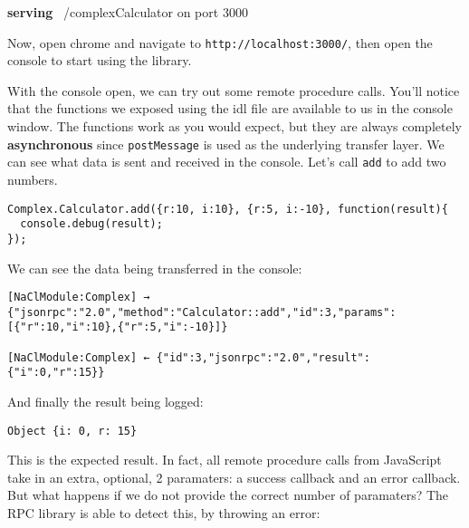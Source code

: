 \documentclass[]{article}
\newenvironment{Shaded}{}{}
\newcommand{\KeywordTok}[1]{\textcolor[rgb]{0.00,0.44,0.13}{\textbf{{#1}}}}
\newcommand{\NormalTok}[1]{{#1}}
\begin{document}
\begin{Shaded}
\begin{Highlighting}[]
\KeywordTok{serving} \NormalTok{~/complexCalculator on port 3000}
\end{Highlighting}
\end{Shaded}

Now, open chrome and navigate to \texttt{http://localhost:3000/}, then
open the console to start using the library.


 With the console open, we can try out some remote procedure calls.
You'll notice that the functions we exposed using the idl file are
available to us in the console window. The functions work as you would
expect, but they are always completely \textbf{asynchronous} since
\texttt{postMessage} is used as the underlying transfer layer. We can
see what data is sent and received in the console. Let's call
\texttt{add} to add two numbers.

\begin{verbatim}
Complex.Calculator.add({r:10, i:10}, {r:5, i:-10}, function(result){
  console.debug(result);
});
\end{verbatim}

We can see the data being transferred in the console:

\begin{verbatim}
[NaClModule:Complex] → {"jsonrpc":"2.0","method":"Calculator::add","id":3,"params":[{"r":10,"i":10},{"r":5,"i":-10}]}

[NaClModule:Complex] ← {"id":3,"jsonrpc":"2.0","result":{"i":0,"r":15}}
\end{verbatim}

And finally the result being logged:

\begin{verbatim}
Object {i: 0, r: 15}
\end{verbatim}

This is the expected result. In fact, all remote procedure calls from
JavaScript take in an extra, optional, 2 paramaters: a success callback
and an error callback. But what happens if we do not provide the correct
number of paramaters? The RPC library is able to detect this, by
throwing an error:
\end{document}
